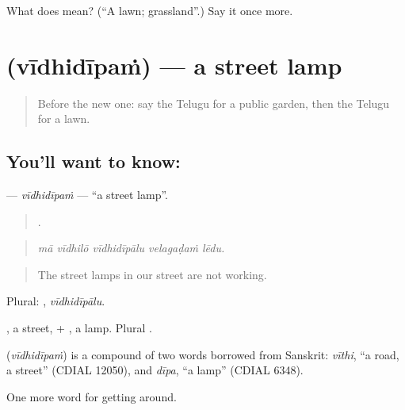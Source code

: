 \begin{tcolorbox}[breakable,colback=teal!4,colframe=teal!35!black,title={Before you move on}]
What does  mean? (\textquotedblleft{}A lawn; grassland\textquotedblright{}.) Say it once more.
\end{tcolorbox}
\section[\texorpdfstring{\te{వీధిదీపం} (vīdhidīpaṁ)}{వీధిదీపం (vīdhidīpaṁ)}]{ (vīdhidīpaṁ) — a street lamp}

\label{lesson:TE-C466-vidhidipam}



\begin{quote}
Before the new one: say the Telugu for a public garden, then the Telugu for a lawn.
\end{quote}

\subsection*{You'll want to know: }
\textbf{} — \emph{vīdhidīpaṁ} — \textquotedblleft{}a street lamp\textquotedblright{}.

\begin{quote}
    .
\end{quote}

\begin{quote}
\emph{mā vīdhilō vīdhidīpālu velagaḍaṁ lēdu.}
\end{quote}

\begin{quote}
The street lamps in our street are not working.
\end{quote}

Plural: , \emph{vīdhidīpālu}.

, a street, + , a lamp. Plural .

\begin{cousinweb}
\textbf{} (\emph{vīdhidīpaṁ}) is a compound of two words borrowed from Sanskrit: \emph{vīthi}, \textquotedblleft{}a road, a street\textquotedblright{} (CDIAL 12050), and \emph{dīpa}, \textquotedblleft{}a lamp\textquotedblright{} (CDIAL 6348).
\end{cousinweb}

\begin{grammarlens}[title={What you've built}]
One more word for getting around.
\end{grammarlens}

